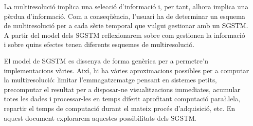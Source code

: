 La multiresolució implica una selecció d'informació i, per tant,
alhora implica una pèrdua d'informació. Com a conseqüència, l'usuari
ha de determinar un esquema de multiresolució per a cada sèrie
temporal que vulgui gestionar amb un \gls{SGSTM}. A partir del model
dels \gls{SGSTM} reflexionarem sobre com gestionen la informació i
sobre quins efectes tenen diferents esquemes de multiresolució.


El model de \gls{SGSTM} es dissenya de forma genèrica per a permetre'n
implementacions vàries. Així, hi ha vàries aproximacions possibles per
a computar la multiresolució: limitar l'emmagatzematge pensant en
sistemes petits, precomputar el resultat per a disposar-ne
visualitzacions immediates, acumular totes les dades i processar-les
en temps diferit aprofitant computació para\l.lela, repartir el temps
de computació durant el mateix procés d'adquisició, etc. En aquest
document explorarem aquestes possibilitats dels \gls{SGSTM}.






